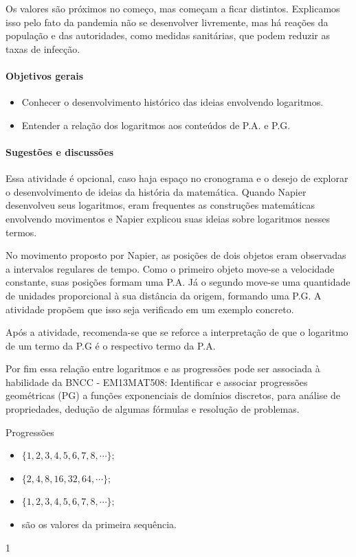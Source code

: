 Os valores são próximos no começo, mas começam a ficar distintos. Explicamos isso pelo fato da pandemia não se desenvolver livremente, mas há reações da população e das autoridades, como medidas sanitárias, que podem reduzir as taxas de infecção.

\clearpage
\begin{texto}
{
	\paragraph{Objetivos gerais}
	\begin{itemize}
	\item Conhecer o desenvolvimento histórico das ideias envolvendo logaritmos.
	\item Entender a relação dos logaritmos aos conteúdos de P.A. e P.G.
	\end{itemize}

	\paragraph{Sugestões e discussões}
	Essa atividade é opcional, caso haja espaço no cronograma e o desejo de explorar o desenvolvimento de ideias da história da matemática. Quando Napier desenvolveu seus logaritmos, eram frequentes as construções matemáticas envolvendo movimentos e Napier explicou suas ideias sobre logaritmos nesses termos.

	No movimento proposto por Napier, as posições de dois objetos eram observadas a intervalos regulares de tempo. Como o primeiro objeto move-se a velocidade constante, suas posições formam uma P.A. Já o segundo move-se uma quantidade de unidades proporcional à sua distância da origem, formando uma P.G. A atividade propõem que isso seja verificado em um exemplo concreto.

	Após a atividade, recomenda-se que se reforce a interpretação de que o logaritmo de um termo da P.G é o respectivo termo da P.A.

	Por fim essa relação entre logaritmos e as progressões pode ser associada à habilidade da BNCC - EM13MAT508: Identificar e associar progressões geométricas (PG) a funções exponenciais de domínios discretos, para análise de propriedades, dedução de algumas fórmulas e resolução de problemas.
}
\end{texto}
\marginpar{\vspace{.5em}}
\begin{answer}{Progressões}
{
	\begin{itemize}
	\item $\{1,2,3,4,5,6,7,8,\cdots\};$
	\item[] $\{2,4,8,16,32,64,\cdots\};$
	\item $\{1,2,3,4,5,6,7,8,\cdots\};$
	\item são os valores da primeira sequência.
	\end{itemize}
}{1}
\end{answer}

